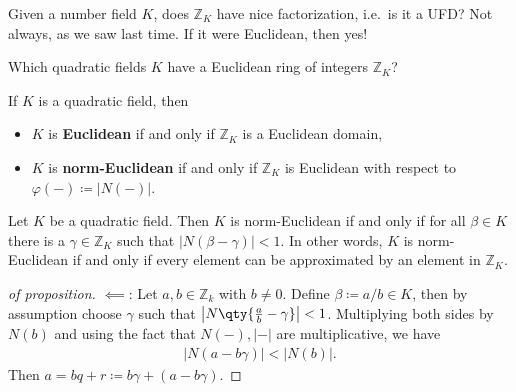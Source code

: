 \begin{remark}

Given a number field \(K\), does \({\mathbb{Z}}_K\) have nice
factorization, i.e.~is it a UFD? Not always, as we saw last time. If it
were Euclidean, then yes!

\end{remark}

\begin{question}

Which quadratic fields \(K\) have a Euclidean ring of integers
\({\mathbb{Z}}_K\)?

\end{question}

\begin{definition}

If \(K\) is a quadratic field, then

\begin{itemize}
\item
  \(K\) is \textbf{Euclidean} if and only if \({\mathbb{Z}}_K\) is a
  Euclidean domain,
\item
  \(K\) is \textbf{norm-Euclidean} if and only if \({\mathbb{Z}}_K\) is
  Euclidean with respect to
  \(\varphi({-}) \coloneqq{\left\lvert {N({-})} \right\rvert}\).
\end{itemize}

\end{definition}

\begin{proposition}

Let \(K\) be a quadratic field. Then \(K\) is norm-Euclidean if and only
if for all \(\beta\in K\) there is a \(\gamma\in {\mathbb{Z}}_K\) such
that \({\left\lvert { N(\beta- \gamma) } \right\rvert} < 1\). In other
words, \(K\) is norm-Euclidean if and only if every element can be
approximated by an element in \({\mathbb{Z}}_K\).

\end{proposition}

\begin{proof}[of proposition]

\(\impliedby\): Let \(a,b \in {\mathbb{Z}}_k\) with \(b\neq 0\). Define
\(\beta\coloneqq a/b \in K\), then by assumption choose \(\gamma\) such
that \({\left\lvert {N \qty{ {a\over b} - \gamma} } \right\rvert}< 1\).
Multiplying both sides by \(N(b)\) and using the fact that
\(N({-}), {\left\lvert {{-}} \right\rvert}\) are multiplicative, we have
\begin{align*}
{\left\lvert {N(a - b \gamma)} \right\rvert} < {\left\lvert {N(b)} \right\rvert} 
.\end{align*}
Then \(a = bq + r \coloneqq b \gamma + (a - b \gamma)\).

\end{proof}

